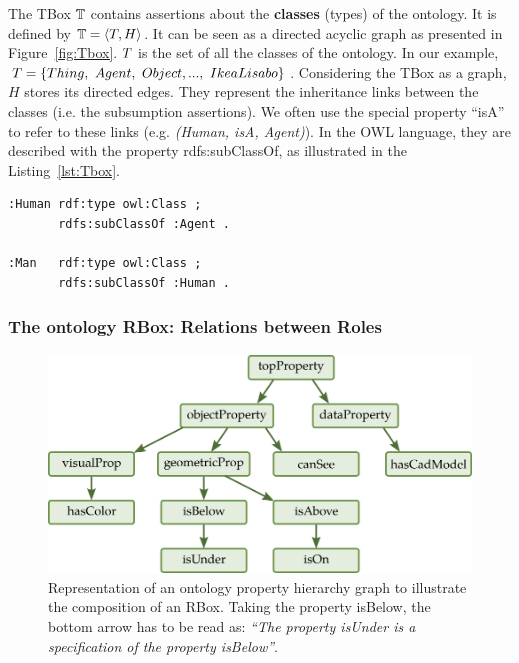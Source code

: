 The TBox $\mathbb{T}$ contains assertions about the \textbf{classes} (types) of the ontology. It is defined by $\mathbb{T} = \langle T, H \rangle$. It can be seen as a directed acyclic graph as presented in Figure~\ref{fig:Tbox}. $T$ is the set of all the classes of the ontology. In our example, $T = \{Thing,\ Agent,\ Object, ...,\ IkeaLisabo\}$. Considering the TBox as a graph, $H$ stores its directed edges. They represent the inheritance links between the classes (i.e. the subsumption assertions). We often use the special property ``isA'' to refer to these links (e.g. \textit{(Human, isA, Agent)}). In the OWL language, they are described with the property rdfs:subClassOf, as illustrated in the Listing~\ref{lst:Tbox}.

\noindent
\begin{minipage}{\textwidth}
\begin{lstlisting}[frame=single, basicstyle=\scriptsize\ttfamily, label={lst:Tbox}, caption={Description of ontology classes in the OWL language using the Turle syntax.},captionpos=b, style=OwlTurtle]
:Human rdf:type owl:Class ;
       rdfs:subClassOf :Agent .

:Man   rdf:type owl:Class ;
       rdfs:subClassOf :Human .
\end{lstlisting}
\end{minipage}

\subsubsection{The ontology RBox: Relations between Roles}

\begin{figure}[ht!]
\centering
\includegraphics[scale=0.4]{figures/chapter2/Rbox.png}
\caption{\label{fig:Rbox} Representation of an ontology property hierarchy graph to illustrate the composition of an RBox. Taking the property isBelow, the bottom arrow has to be read as: \textit{``The property isUnder is a specification of the property isBelow''}.}
\end{figure}

